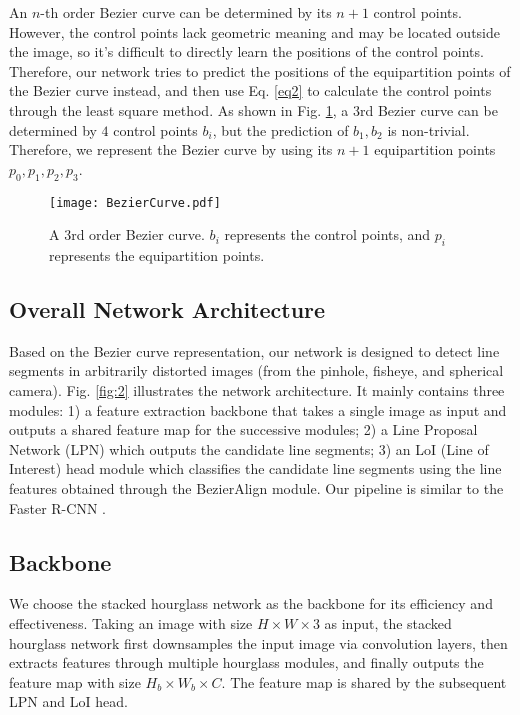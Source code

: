 \documentclass[letterpaper, 10 pt, conference]{ieeeconf}
\begin{document}
An $n$-th order Bezier curve can be determined by its $n+1$ control points. However, the control points lack geometric meaning and may be located outside the image, so it's difficult to directly learn the positions of the control points. Therefore, our network tries to predict the positions of the equipartition points of the Bezier curve instead, and then use Eq. \ref{eq2} to calculate the control points through the least square method. As shown in Fig. \ref{fig:3}, a $3$rd Bezier curve can be determined by $4$ control points $b_i$, but the prediction of $b_1, b_2$ is non-trivial. Therefore, we represent the Bezier curve by using its $n+1$ equipartition points $p_0, p_1, p_2, p_3$.
\begin{figure}[h]
	\begin{center}
		\texttt{[image: BezierCurve.pdf]}
	\end{center}
	\caption{A $3$rd order Bezier curve. $b_i$ represents the control points, and $p_i$ represents the equipartition points.}
	\label{fig:3}
\end{figure} 

\subsection{Overall Network Architecture} \label{sec3-2}
Based on the Bezier curve representation, our network is designed to detect line segments in arbitrarily distorted images (from the pinhole, fisheye, and spherical camera). Fig. \ref{fig:2} illustrates the network architecture. It mainly contains three modules: 1) a feature extraction backbone that takes a single image as input and outputs a shared feature map for the successive modules; 2) a Line Proposal Network (LPN) which outputs the candidate line segments; 3) an LoI (Line of Interest) head module which classifies the candidate line segments using the line features obtained through the BezierAlign module. Our pipeline is similar to the Faster R-CNN \cite{FasterRCNN}.

\subsection{Backbone} \label{sec3-3}
We choose the stacked hourglass network \cite{SHN} as the backbone for its efficiency and effectiveness. Taking an image with size $H \times W \times 3$ as input, the stacked hourglass network first downsamples the input image via convolution layers, then extracts features through multiple hourglass modules, and finally outputs the feature map with size $H_b \times W_b \times C$. The feature map is shared by the subsequent LPN and LoI head.
\end{document}
